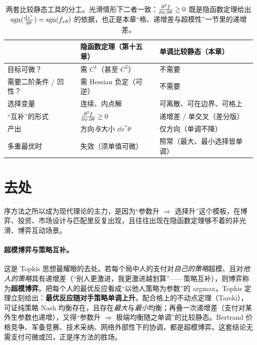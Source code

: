 \begin{table}[h]
\centering
\renewcommand{\arraystretch}{1.3}
\begin{tabular}{@{}lll@{}}
\toprule
 & 隐函数定理（第十五章） & 单调比较静态（本章） \\
\midrule
目标可微？        & 需 $C^1$（甚至 $C^2$） & 不需要 \\
需要二阶条件 / 凹性？ & 需 Hessian 负定（可逆） & 不需要 \\
选择变量          & 连续、内点解         & 可离散、可在边界、可格上 \\
``互补''的形式     & $\frac{\partial^2 f}{\partial x\,\partial \theta}\ge 0$ & 递增差 / 单交叉（差分版） \\
产出              & 方向\emph{与}大小 $\dd{x^*}{\theta}$ & 仅方向（单调不降） \\
多重最优时         & 失效（须单值可微）    & 照常（最大、最小选择皆单调） \\
\bottomrule
\end{tabular}
\caption{两套比较静态工具的分工。光滑情形下二者一致：$\frac{\partial^2 f}{\partial x\,\partial \theta}\ge 0$ 既是隐函数定理给出 $\operatorname{sgn}(\frac{\mathop{}\!\mathrm{d} x^*}{\mathop{}\!\mathrm{d} \theta})=\operatorname{sgn}(f_{x\theta})$ 的依据，也正是本章``格、递增差与超模性''一节里的递增差。}
\label{tab:monotone-compare}
\end{table}


\section{去处}
\label{sec:monotone-6}

序方法之所以成为现代理论的主力，是因为``参数升 $\Rightarrow$ 选择升''这个模板，在博弈、投资、市场设计与匹配里反复出现，且往往出现在隐函数定理够不着的非光滑、博弈互动场景。

\paragraph{超模博弈与策略互补。}
这是 Topkis 思想最耀眼的去处。若每个局中人的支付对\emph{自己的策略}超模、且对\emph{他人的策略}具有递增差（``别人更激进，我更激进越划算''——策略互补），则博弈称为\textbf{超模博弈}。把每个人的最优反应看成``以他人策略为参数''的 argmax，Topkis 定理立刻给出：\textbf{最优反应随对手策略单调上升}。配合格上的不动点定理（Tarski），可证纯策略 Nash 均衡存在，且存在\emph{最大}与\emph{最小}均衡；再叠一次递增差（支付对某外生参数也递增），又得``参数升 $\Rightarrow$ 极端均衡随之单调''的比较静态。Bertrand 价格竞争、军备竞赛、技术采纳、网络外部性下的协调，都是超模博弈。这套结论无需支付可微或凹，正是序方法的胜场。

